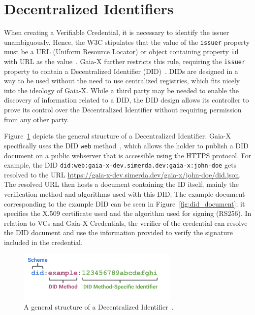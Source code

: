 \section{Decentralized Identifiers}\label{sec:decentralized-identifiers}

When creating a Verifiable Credential, it is necessary to identify the issuer unambiguously.
Hence, the W3C stipulates that the value of the \texttt{issuer} property must be a URL (Uniform Resource Locator) or object containing property \texttt{id} with URL as the value~\cite{verifiable_credentials}.
Gaia-X further restricts this rule, requiring the \texttt{issuer} property to contain a Decentralized Identifier (DID)~\cite{did}.
DIDs are designed in a way to be used without the need to use centralized registries, which fits nicely into the ideology of Gaia-X.
While a third party may be needed to enable the discovery of information related to a DID, the DID design allows its controller to prove its control over the Decentralized Identifier without requiring permission from any other party.

Figure~\ref{fig:did_structure} depicts the general structure of a Decentralized Identifier.
Gaia-X specifically uses the DID \texttt{web} method~\cite{didweb}, which allows the holder to publish a DID document on a public webserver that is accessible using the HTTPS protocol.
For example, the DID \texttt{did:web:gaia-x-dev.simerda.dev:gaia-x:john-doe} gets resolved to the URL \url{https://gaia-x-dev.simerda.dev/gaia-x/john-doe/did.json}.
The resolved URL then hosts a document containing the ID itself, mainly the verification method and algorithms used with this DID.
The example document corresponding to the example DID can be seen in Figure~\ref{fig:did_document}; it specifies the X.509 certificate used and the algorithm used for signing (RS256).
In relation to VCs and Gaia-X Credentials, the verifier of the credential can resolve the DID document and use the information provided to verify the signature included in the credential.

\begin{figure}
    \centering
    \includegraphics[width=0.7\textwidth]{figures/parts-of-a-did.png}
    \caption{A general structure of a Decentralized Identifier~\cite{did}.}\label{fig:did_structure}
\end{figure}

